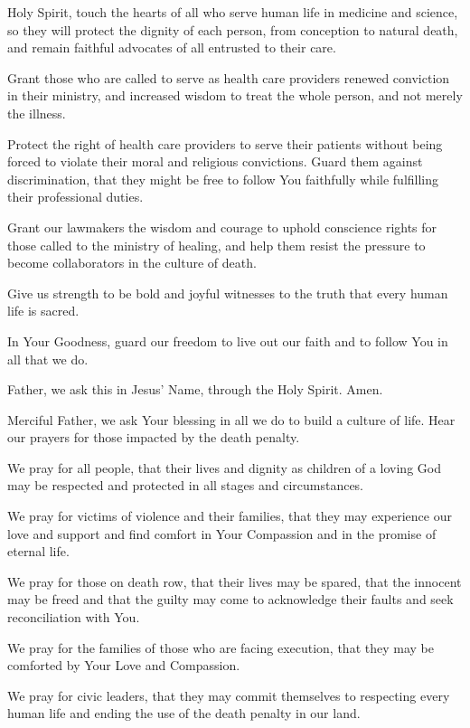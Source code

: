 Holy Spirit, touch the hearts of all who serve human life in medicine and science, so they will protect the dignity of each person, from conception to natural death, and remain faithful advocates of all entrusted to their care.  

Grant those who are called to serve as health care providers renewed conviction in their ministry, and increased wisdom to treat the whole person, and not merely the illness.

Protect the right of health care providers to serve their patients without being forced to violate their moral and religious convictions.
Guard them against discrimination, that they might be free to follow You faithfully while fulfilling their professional duties.

Grant our lawmakers the wisdom and courage to uphold conscience rights for those called to the ministry of healing, and help them resist the pressure to become collaborators in the culture of death.

Give us strength to be bold and joyful witnesses to the truth that every human life is sacred.

In Your Goodness, guard our freedom to live out our faith and to follow You in all that we do.

Father, we ask this in Jesus' Name, through the Holy Spirit. Amen.

Merciful Father, we ask Your blessing in all we do to build a culture of life.
Hear our prayers for those impacted by the death penalty.

We pray for all people, that their lives and dignity as children of a loving God may be respected and protected in all stages and circumstances.

We pray for victims of violence and their families, that they may experience our love and support and find comfort in Your Compassion and in the promise of eternal life.

We pray for those on death row, that their lives may be spared, that the innocent may be freed and that the guilty may come to acknowledge their faults and seek reconciliation with You.

We pray for the families of those who are facing execution, that they may be comforted by Your Love and Compassion.

We pray for civic leaders, that they may commit themselves to respecting every human life and ending the use of the death penalty in our land.

